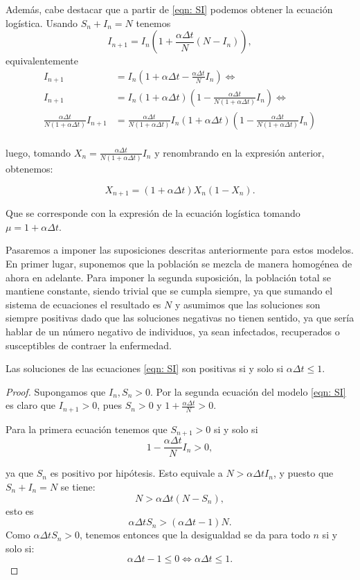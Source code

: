 Además, cabe destacar que a partir de \eqref{eqn: SI} podemos obtener la ecuación logística. Usando $S_n+I_n=N$ tenemos
$$I_{n+1} = I_n \left( 1+\frac{\alpha\Delta t}{N} (N-I_n)\right) ,$$
equivalentemente
\begin{equation}
\begin{aligned}
I_{n+1} & = I_n \left( 1+\alpha\Delta t - \frac{\alpha\Delta t}{N}I_n \right) \Leftrightarrow \\
I_{n+1} & = I_n (1+\alpha\Delta t) \left( 1-\frac{\alpha\Delta t}{N(1+\alpha\Delta t)}I_n \right) \Leftrightarrow \\
\frac{\alpha\Delta t}{N(1+\alpha\Delta t)} I_{n+1} & = \frac{\alpha\Delta t}{N(1+\alpha\Delta t)}I_n(1+\alpha\Delta t) \left( 1- \frac{\alpha\Delta t}{N(1+\alpha\Delta t)} I_n \right) \\
\end{aligned}
\end{equation}

luego, tomando $X_n = \frac{\alpha\Delta t}{N(1+\alpha\Delta t)} I_n$ y renombrando en la expresión anterior, obtenemos:

$$X_{n+1} = (1 + \alpha\Delta t ) X_n(1-X_n).$$

Que se corresponde con la expresión de la ecuación logística tomando $\mu = 1+\alpha\Delta t$.


Pasaremos a imponer las suposiciones descritas anteriormente para estos modelos. En primer lugar, suponemos que la población se mezcla de manera homogénea de ahora en adelante. Para imponer la segunda suposición, la población total se mantiene constante, siendo trivial que se cumpla siempre, ya que sumando el sistema de ecuaciones el resultado es $N$ y asumimos que las soluciones son siempre positivas dado que las soluciones negativas no tienen sentido, ya que sería hablar de un número negativo de individuos, ya sean infectados, recuperados o susceptibles de contraer la enfermedad.

\begin{proposition}
Las soluciones de las ecuaciones \eqref{eqn: SI} son positivas si y solo si $\alpha\Delta t \leq 1$.
\end{proposition}

\begin{proof}
Supongamos que $I_n, S_n > 0$. Por la segunda ecuación del modelo \eqref{eqn: SI} es claro que $I_{n+1}>0$, pues $S_n>0$ y $1+\frac{\alpha\Delta t}{N}>0$.

Para la primera ecuación tenemos que $S_{n+1} > 0$ si y solo si
$$1-\frac{\alpha\Delta t}{N}I_n >0,$$

ya que $S_n$ es positivo por hipótesis. Esto equivale a $N>\alpha \Delta t I_n$, y puesto que $S_n+I_n=N$ se tiene:
$$N>\alpha\Delta t(N-S_n),$$
esto es
$$\alpha\Delta t S_n > (\alpha\Delta t -1) N.$$
Como $\alpha\Delta t S_n > 0$, tenemos entonces que la desigualdad se da para todo $n$ si y solo si:
$$\alpha\Delta t -1 \leq 0 \Leftrightarrow \alpha\Delta t \leq 1.$$
\end{proof}

